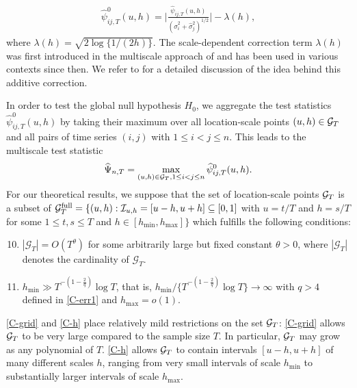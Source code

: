 \documentclass[12pt]{article}
\begin{document}
\begin{align}\label{eq:psi_zero_ij}
\widehat{\psi}^0_{ij, T}(u, h) =  \Big|\frac{\widehat{\psi}_{ij, T}(u, h)}{(\widehat{\sigma}_i^2 + \widehat{\sigma}_j^2)^{1/2}}\Big| - \lambda(h),
\end{align}
where $\lambda(h) = \sqrt{2 \log \{ 1/(2h) \}}$. The scale-dependent correction term $\lambda(h)$ was first introduced in the multiscale approach of \cite{DuembgenSpokoiny2001} and has been used in various contexts since then. We refer to \citet{KhismatullinaVogt2020} for a detailed discussion of the idea behind this additive correction. 


In order to test the global null hypothesis $H_0$, we aggregate the test statistics $\widehat{\psi}^0_{ij, T}(u, h)$ by taking their maximum over all location-scale points $(u,h) \in \mathcal{G}_T$ and all pairs of time series $(i,j)$ with $1 \le i < j \le n$. This leads to the multiscale test statistic 
\[ \widehat{\Psi}_{n,T} = \max_{(u,h) \in \mathcal{G}_T, 1 \le i < j \le n} \widehat{\psi}^0_{ij, T}(u, h). \]
For our theoretical results, we suppose that the set of location-scale points $\mathcal{G}_T$ is a subset of $\mathcal{G}_T^{\text{full}} = \{ (u, h): \mathcal{I}_{u, h} = [u-h,u+h] \subseteq [0,1]$ with $u = t/T$ and $h = s/T$  for some $1 \le t, s \le T$ and $h \in [h_{\min},h_{\max}] \}$ which fulfills the following conditions:
\begin{enumerate}[label=(C\arabic*),leftmargin=1.2cm, itemsep=0pt, parsep=0pt]
\setcounter{enumi}{9}

\item \label{C-grid} $|\mathcal{G}_T| = O(T^\theta)$ for some arbitrarily large but fixed constant $\theta > 0$, where $|\mathcal{G}_T|$ denotes the cardinality of $\mathcal{G}_T$. 

\item \label{C-h} $h_{\min} \gg T^{-(1-\frac{2}{q})} \log T$, that is, $h_{\min} / \{ T^{-(1-\frac{2}{q})} \log T \} \rightarrow \infty$ with $q > 4$ defined in \ref{C-err1} and $h_{\max} = o(1)$.

\end{enumerate}
\ref{C-grid} and \ref{C-h} place relatively mild restrictions on the set $\mathcal{G}_T$: \ref{C-grid} allows $\mathcal{G}_T$ to be very large compared to the sample size $T$. In particular, $\mathcal{G}_T$ may grow as any polynomial of $T$. \ref{C-h} allows $\mathcal{G}_T$ to contain intervals $[u-h,u+h]$ of many different scales $h$, ranging from very small intervals of scale $h_{\min}$ to substantially larger intervals of scale $h_{\max}$. 
\end{document}

